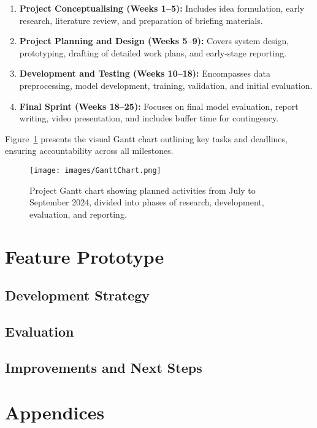 \documentclass[12pt]{article}
\begin{document}
\begin{enumerate}
    \item \textbf{Project Conceptualising (Weeks 1–5):} Includes idea formulation, early research, literature review, and preparation of briefing materials.
    \item \textbf{Project Planning and Design (Weeks 5–9):} Covers system design, prototyping, drafting of detailed work plans, and early-stage reporting.
    \item \textbf{Development and Testing (Weeks 10–18):} Encompasses data preprocessing, model development, training, validation, and initial evaluation.
    \item \textbf{Final Sprint (Weeks 18–25):} Focuses on final model evaluation, report writing, video presentation, and includes buffer time for contingency.
\end{enumerate}

Figure~\ref{fig:gantt} presents the visual Gantt chart outlining key tasks and deadlines, ensuring accountability across all milestones.

\begin{figure}[H]
    \centering
    \texttt{[image: images/GanttChart.png]}
    \caption{Project Gantt chart showing planned activities from July to September 2024, divided into phases of research, development, evaluation, and reporting.}
    \label{fig:gantt}
\end{figure}

\newpage
\section{Feature Prototype}
\subsection{Development Strategy}
\subsection{Evaluation}
\subsection{Improvements and Next Steps}

\newpage
\section{Appendices}
\end{document}
